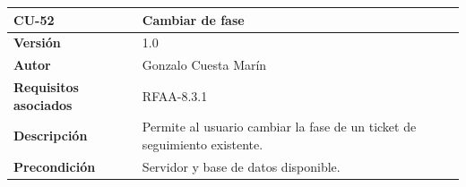 \documentclass[
]{article}
\begin{document}
\begin{longtable}[]{@{}ll@{}}
\toprule
\begin{minipage}[b]{0.21\columnwidth}\raggedright
\textbf{CU-52}\strut
\end{minipage} & \begin{minipage}[b]{0.73\columnwidth}\raggedright
\textbf{Cambiar de fase}\strut
\end{minipage}\tabularnewline
\midrule
\endhead
\begin{minipage}[t]{0.21\columnwidth}\raggedright
\textbf{Versión}\strut
\end{minipage} & \begin{minipage}[t]{0.73\columnwidth}\raggedright
1.0\strut
\end{minipage}\tabularnewline
\begin{minipage}[t]{0.21\columnwidth}\raggedright
\textbf{Autor}\strut
\end{minipage} & \begin{minipage}[t]{0.73\columnwidth}\raggedright
Gonzalo Cuesta Marín\strut
\end{minipage}\tabularnewline
\begin{minipage}[t]{0.21\columnwidth}\raggedright
\textbf{Requisitos asociados}\strut
\end{minipage} & \begin{minipage}[t]{0.73\columnwidth}\raggedright
RFAA-8.3.1\strut
\end{minipage}\tabularnewline
\begin{minipage}[t]{0.21\columnwidth}\raggedright
\textbf{Descripción}\strut
\end{minipage} & \begin{minipage}[t]{0.73\columnwidth}\raggedright
Permite al usuario cambiar la fase de un ticket de seguimiento
existente.\strut
\end{minipage}\tabularnewline
\begin{minipage}[t]{0.21\columnwidth}\raggedright
\textbf{Precondición}\strut
\end{minipage} & \begin{minipage}[t]{0.73\columnwidth}\raggedright
Servidor y base de datos disponible.


\end{minipage}
\end{longtable}
\end{document}
